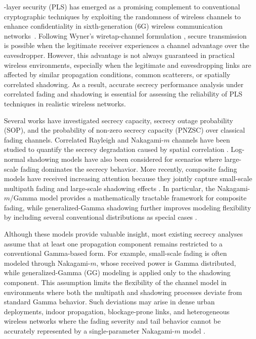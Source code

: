\documentclass[lettersize,journal]{IEEEtran}
\begin{document}
-layer security (PLS) has emerged as a promising complement to conventional cryptographic techniques by exploiting the randomness of wireless channels to enhance confidentiality in sixth-generation (6G) wireless communication networks~\cite{11036803}. Following Wyner's wiretap-channel formulation \cite{6772207}, secure transmission is possible when the legitimate receiver experiences a channel advantage over the eavesdropper. However, this advantage is not always guaranteed in practical wireless environments, especially when the legitimate and eavesdropping links are affected by similar propagation conditions, common scatterers, or spatially correlated shadowing. As a result, accurate secrecy performance analysis under correlated fading and shadowing is essential for assessing the reliability of PLS techniques in realistic wireless networks.

Several works have investigated secrecy capacity, secrecy outage probability (SOP), and the probability of non-zero secrecy capacity (PNZSC) over classical fading channels. Correlated Rayleigh and Nakagami-\(m\) channels have been studied to quantify the secrecy degradation caused by spatial correlation \cite{8060499}. Log-normal shadowing models have also been considered for scenarios where large-scale fading dominates the secrecy behavior. More recently, composite fading models have received increasing attention because they jointly capture small-scale multipath fading and large-scale shadowing effects \cite{9239955,9768319}. In particular, the Nakagami-\(m\)/Gamma model provides a mathematically tractable framework for composite fading, while generalized-Gamma shadowing further improves modeling flexibility by including several conventional distributions as special cases \cite{8060499}.

Although these models provide valuable insight, most existing secrecy analyses assume that at least one propagation component remains restricted to a conventional Gamma-based form. For example, small-scale fading is often modeled through Nakagami-\(m\), whose received power is Gamma distributed, while generalized-Gamma (GG) modeling is applied only to the shadowing component. This assumption limits the flexibility of the channel model in environments where both the multipath and shadowing processes deviate from standard Gamma behavior. Such deviations may arise in dense urban deployments, indoor propagation, blockage-prone links, and heterogeneous wireless networks where the fading severity and tail behavior cannot be accurately represented by a single-parameter Nakagami-\(m\) model \cite{8917797}.
\end{document}
